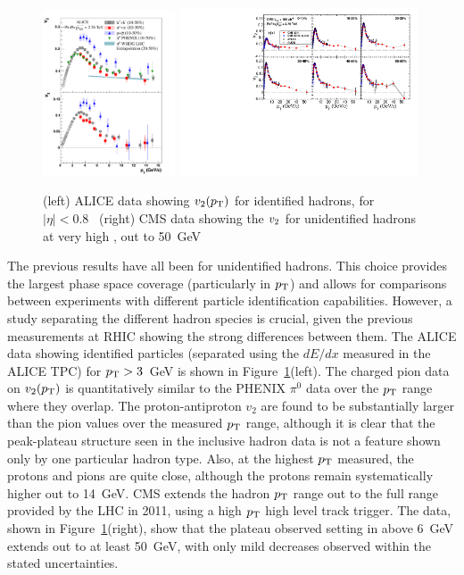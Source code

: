 \begin{figure}[!tb]
\begin{center}
\includegraphics[width=0.35\textwidth]{flowcorrelations_figs/alice_fig5_vn_pid.pdf}
\includegraphics[width=0.63\textwidth]{flowcorrelations_figs/v2_pt_ep_atlas_alice_eta0-1_band_v5.pdf}
\caption[]{(left) ALICE data showing $\mbox{$v_2$}(\mbox{$p_{\mathrm{T}}$})$ for identified
  hadrons, for $|\eta|<0.8$~\cite{Abelev:2012di} (right) CMS data
  showing the $\mbox{$v_2$}$ for unidentified hadrons at very high \pT, out
  to 50~GeV~\cite{Chatrchyan:2012xq}}
\label{fig:pas:fc:highpt}
\end{center}
\end{figure}
The previous results have all been for unidentified hadrons.  This choice provides the largest phase
space coverage (particularly in $\mbox{$p_{\mathrm{T}}$}$) and allows for comparisons between experiments with different particle
identification capabilities.  However, a study separating the different hadron species is crucial,
given the previous measurements at RHIC showing the strong differences between them.
The ALICE data showing identified particles (separated using the $dE/dx$ measured in the ALICE TPC) for $\mbox{$p_{\mathrm{T}}$}>3$~GeV
is shown in Figure~\ref{fig:pas:fc:highpt}(left).  The charged pion data on $v_2(\mbox{$p_{\mathrm{T}}$})$ is quantitatively similar to
the PHENIX $\pi^0$ data over the $\mbox{$p_{\mathrm{T}}$}$ range where they overlap.  The proton-antiproton $v_2$ are found to be
substantially larger than the pion values over the measured $\mbox{$p_{\mathrm{T}}$}$ range, although it is clear that the peak-plateau
structure seen in the inclusive hadron data is not a feature shown only 
by one particular hadron type.
Also, at the highest $\mbox{$p_{\mathrm{T}}$}$ measured, the protons and pions are quite close, although the protons remain
systematically higher out to 14~GeV.
CMS extends the hadron $\mbox{$p_{\mathrm{T}}$}$ range out to the full range provided by the LHC in 2011, using a high $\mbox{$p_{\mathrm{T}}$}$
high level track trigger.  The data, shown in Figure~\ref{fig:pas:fc:highpt}(right), show that the
plateau observed setting in above 6~GeV extends out to at least 50~GeV, with only mild decreases observed within
the stated uncertainties.

